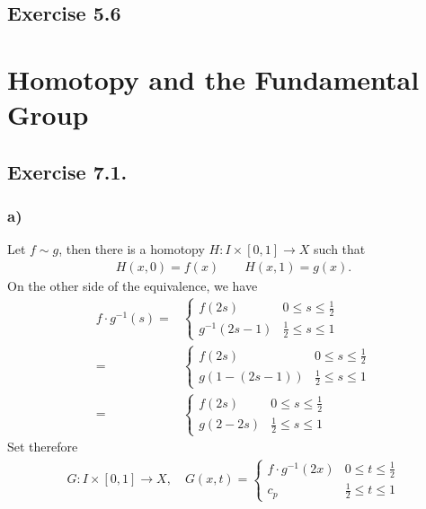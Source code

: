 \documentclass[a4paper]{book}
\theoremstyle{definition}
\begin{document}
\section*{Exercise 5.6}


\chapter{Homotopy and the Fundamental Group}

\section*{Exercise 7.1.}

\subsection*{a)}
Let \(f \sim g\), then there is a homotopy \(H: I \times [0, 1] \longrightarrow X\) such that
\begin{align*}
    H(x, 0) = f(x) \qquad H(x, 1) = g(x) \text{.}
\end{align*}
On the other side of the equivalence, we have
\begin{align*}
    f \cdot g^{-1}(s) =& \begin{cases}
        f(2s) & 0 \leq s \leq \frac{1}{2} \\
        g^{-1}(2s - 1) & \frac{1}{2} \leq s \leq 1
    \end{cases} \\
    =& \begin{cases}
        f(2s) & 0 \leq s \leq \frac{1}{2} \\
        g(1 - (2s - 1)) & \frac{1}{2} \leq s \leq 1
    \end{cases} \\
    =& \begin{cases}
        f(2s) & 0 \leq s \leq \frac{1}{2} \\
        g(2 - 2s) & \frac{1}{2} \leq s \leq 1
    \end{cases}
\end{align*}
Set therefore
\begin{align*}
    G: I \times [0, 1] \longrightarrow X, \quad G(x, t) = \begin{cases}
        f \cdot g^{-1} (2x) & 0 \leq t \leq \frac{1}{2} \\
        c_p & \frac{1}{2} \leq t \leq 1
    \end{cases}
\end{align*}
\end{document}
